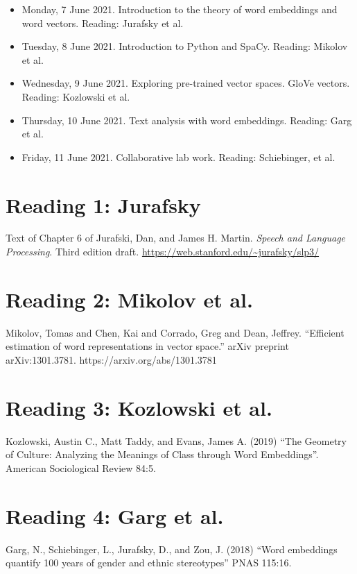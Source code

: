 \documentclass[a4paper]{report}
\begin{document}
\begin{itemize}
  \item Monday, 7 June 2021. Introduction to the theory of word embeddings and word vectors. Reading: Jurafsky et al.
  \item Tuesday, 8 June 2021. Introduction to Python and SpaCy. Reading: Mikolov et al.
  \item Wednesday, 9 June 2021. Exploring pre-trained vector spaces. GloVe vectors. Reading: Kozlowski et al.
  \item Thursday, 10 June 2021. Text analysis with word embeddings. Reading: Garg et al.
  \item Friday, 11 June 2021. Collaborative lab work. Reading: Schiebinger, et al.
\end{itemize}

\chapter{Reading 1: Jurafsky}

Text of Chapter 6 of Jurafski, Dan, and James H. Martin. \emph{Speech and Language Processing}. Third edition draft. \url{https://web.stanford.edu/~jurafsky/slp3/}

  

\chapter{Reading 2: Mikolov et al.}

Mikolov, Tomas and Chen, Kai and Corrado, Greg and Dean, Jeffrey. ``Efficient estimation of word representations in vector space.'' arXiv preprint arXiv:1301.3781. https://arxiv.org/abs/1301.3781

  

\chapter{Reading 3: Kozlowski et al.}

Kozlowski, Austin C., Matt Taddy, and Evans, James A. (2019) ``The Geometry of Culture: Analyzing the Meanings of Class through Word Embeddings''. American Sociological Review 84:5.

  

\chapter{Reading 4: Garg et al.}

Garg, N., Schiebinger, L., Jurafsky, D., and Zou, J. (2018) ``Word embeddings quantify 100 years of gender and ethnic stereotypes'' PNAS 115:16.

  
\end{document}
